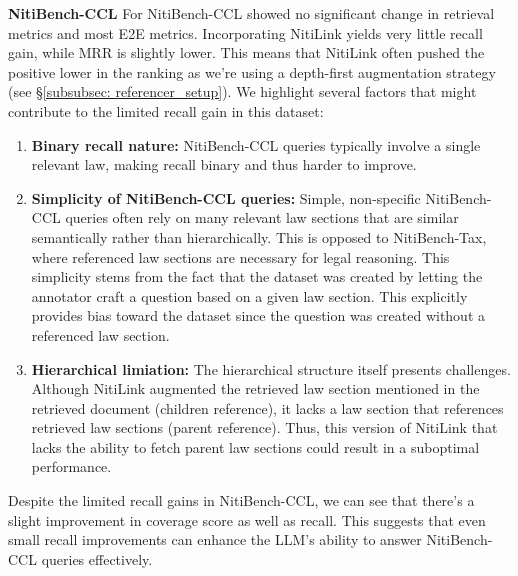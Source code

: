 \textbf{NitiBench-CCL} For NitiBench-CCL showed no significant change in retrieval metrics and most E2E metrics.
%
Incorporating NitiLink yields very little recall gain, while MRR is slightly lower. 
%
This means that NitiLink often pushed the positive lower in the ranking as we're using a depth-first augmentation strategy (see \S\ref{subsubsec: referencer_setup}).
%
We highlight several factors that might contribute to the limited recall gain in this dataset:
\begin{enumerate}
    \item \textbf{Binary recall nature:} NitiBench-CCL queries typically involve a single relevant law, making recall binary and thus harder to improve.
    \item \textbf{Simplicity of NitiBench-CCL queries:} Simple, non-specific NitiBench-CCL queries often rely on many relevant law sections that are similar semantically rather than hierarchically. 
    This is opposed to NitiBench-Tax, where referenced law sections are necessary for legal reasoning.
    This simplicity stems from the fact that the dataset was created by letting the annotator craft a question based on a given law section.
    This explicitly provides bias toward the dataset since the question was created without a referenced law section.
    \item \textbf{Hierarchical limiation:} The hierarchical structure itself presents challenges. 
    Although NitiLink augmented the retrieved law section mentioned in the retrieved document (children reference), it lacks a law section that references retrieved law sections (parent reference).  
    Thus, this version of NitiLink that lacks the ability to fetch parent law sections could result in a suboptimal performance.
\end{enumerate}

Despite the limited recall gains in NitiBench-CCL, we can see that there's a slight improvement in coverage score as well as recall.
%
This suggests that even small recall improvements can enhance the LLM's ability to answer NitiBench-CCL queries effectively.

